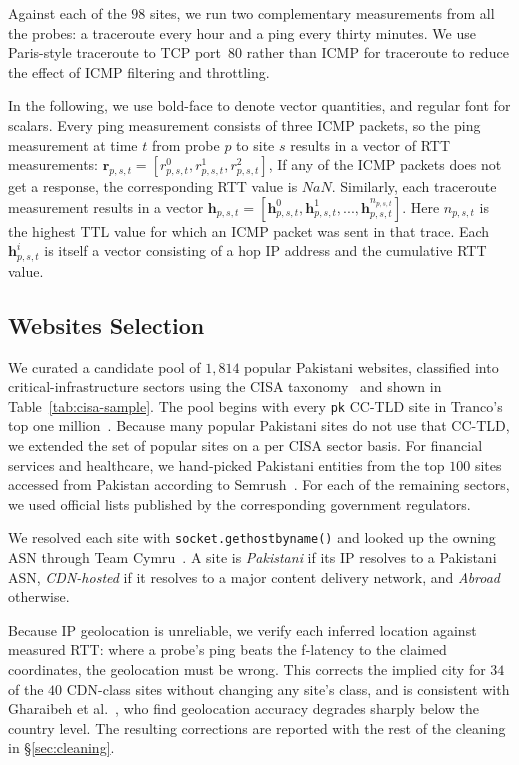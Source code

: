 \documentclass[sigconf,anonymous,10pt]{acmart}
\begin{document}
Against each of the $98$ sites, we run two complementary measurements from all the probes: a traceroute every hour and a ping every thirty minutes.
We use Paris-style traceroute to TCP port~$80$ rather than ICMP for traceroute to reduce the effect of ICMP filtering and throttling.

In the following, we use bold-face to denote vector quantities, and regular font for scalars. Every ping measurement consists of three ICMP packets, so the ping measurement at time $t$ from probe $p$ to site $s$ results in a vector of RTT measurements: $\textbf{r}_{p, s, t} = [r_{p, s, t}^0, r_{p, s, t}^1, r_{p, s, t}^2]$, If any of the ICMP packets does not get a response, the corresponding RTT value is $NaN$. Similarly, each
traceroute measurement results in a vector $\textbf{h}_{p, s, t} = [\textbf{h}_{p, s, t}^0,
\textbf{h}_{p, s, t}^1, ..., \textbf{h}_{p, s, t}^{n_{p, s, t}}]$. Here $n_{p, s, t}$ is the
highest TTL value for which an ICMP packet was sent in that trace. Each $\textbf{h}_{p, s,
t}^i$ is itself a vector consisting of a hop IP address and the cumulative RTT value.
\subsection{Websites Selection}
\label{subsec:sites}

We curated a candidate pool of $1,814$ popular Pakistani websites, classified into critical-infrastructure sectors using the CISA taxonomy~\cite{cisa} and shown in Table~\ref{tab:cisa-sample}. The pool begins with every \texttt{pk} CC-TLD site in Tranco's top one million~\cite{tranco}. Because many popular Pakistani sites do not use that CC-TLD, we extended the set of popular sites on a per CISA sector basis. For financial services and healthcare, we hand-picked Pakistani entities from the top $100$ sites accessed from Pakistan according to Semrush~\cite{semrush}. For each of the remaining sectors, we used official lists published by the corresponding government regulators.

We resolved each site with \texttt{socket.gethostbyname()} and looked up the owning ASN through Team Cymru~\cite{cymru}. A site is \textit{Pakistani} if its IP resolves to a Pakistani ASN, \textit{CDN-hosted} if it resolves to a major content delivery network, and \textit{Abroad} otherwise.

Because IP geolocation is unreliable, we verify each inferred location against measured RTT: where a probe's ping beats the f-latency to the claimed coordinates, the geolocation must be wrong. This corrects the implied city for $34$ of the $40$ CDN-class sites without changing any site's class, and is consistent with Gharaibeh et al.~\cite{gharaibeh:imc:2011}, who find geolocation accuracy degrades sharply below the country level. The resulting corrections are reported with the rest of the cleaning in \S\ref{sec:cleaning}.
\end{document}
